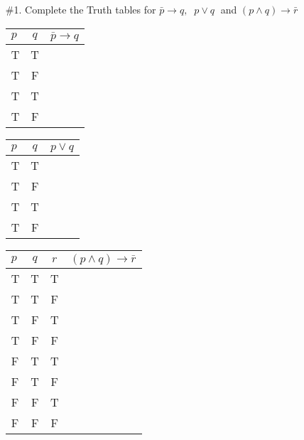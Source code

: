 \documentclass[10pt,letterpaper]{article}
\begin{document}
{

\begin{enumerate}
    \item[\#1.] Complete the Truth tables for $\bar{p} \rightarrow{}q, \;\; p \vee q \;$ and $(p \wedge q) \rightarrow{} \bar{r}$
    
    
\begin{table}[h!]
    \label{tab:table1}
    \begin{tabular}{l|c|r} %
      $p$ & $q$ & $\bar{p} \rightarrow{q}$ \\
      \hline
      T & T & \\
      T & F & \\
      T & T & \\
      T & F & \\
    \end{tabular}
\end{table}

\begin{table}[h!]
    \label{tab:table2}
    \begin{tabular}{l|c|r} %
      $p$ & $q$ & $p \vee q$ \\
      \hline
      T & T & \\
      T & F & \\
      T & T & \\
      T & F & \\
    \end{tabular}
\end{table}

\begin{table}[h!]
    \label{tab:table3}
    \begin{tabular}{l|c|c|r} %
      $p$ & $q$ & $r$ & $(p \wedge q) \rightarrow{\bar{r}}$ \\
      \hline
      T & T & T\\
      T & T & F\\
      T & F & T\\
      T & F & F\\
      F & T & T\\
      F & T & F\\
      F & F & T\\
      F & F & F\\
    \end{tabular}
\end{table}


\end{enumerate}}
\end{document}
